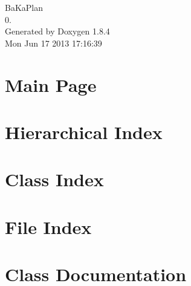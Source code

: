 \documentclass[twoside]{book}
\newcommand{\clearemptydoublepage}{%
  \newpage{\pagestyle{empty}\cleardoublepage}%
}
\begin{document}
\hypersetup{pageanchor=false}
\begin{titlepage}
\vspace*{7cm}
\begin{center}%
{\Large Ba\-Ka\-Plan \\[1ex]\large 0. }\\
\vspace*{1cm}
{\large Generated by Doxygen 1.8.4}\\
\vspace*{0.5cm}
{\small Mon Jun 17 2013 17:16:39}\\
\end{center}
\end{titlepage}
\clearemptydoublepage
\tableofcontents
\clearemptydoublepage
{}
\hypersetup{pageanchor=true}

\chapter{Main Page}
\label{index}\hypertarget{index}{}
\chapter{Hierarchical Index}

\chapter{Class Index}

\chapter{File Index}

\chapter{Class Documentation}
























\end{document}
